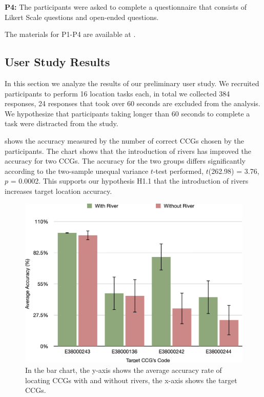 \textbf{P4:} The participants were asked to complete a questionnaire that consists of Likert Scale questions and open-ended questions.

The materials for P1-P4 are available at .

\subsection{User Study Results}

In this section we analyze the results of our preliminary user study. We recruited \pCount participants to perform 16 location tasks each, in total we collected 384 responses, 24 responses that took over 60 seconds are excluded from the analysis. We hypothesize that participants taking longer than 60 seconds to complete a task were distracted from the study.

  shows the accuracy measured by the number of correct CCGs chosen by the participants. The chart shows that the introduction of rivers has improved the accuracy for two CCGs. The accuracy for the two groups differs significantly according to the two-sample unequal variance $t$-test performed, $t$(262.98) = 3.76, $p$ = 0.0002. This supports our hypothesis H1.1 that the introduction of rivers increases target location accuracy.

    {
        \begin{figure}[tb!]
            \centering
            \includegraphics[width=\columnwidth,keepaspectratio]{figure/evaluation/accuracy.png}
            \caption{In the bar chart, the y-axis shows the average accuracy rate of locating CCGs with and without rivers, the x-axis shows the target CCGs.}
            \label{fig:task-acc}
        \end{figure}
    }


